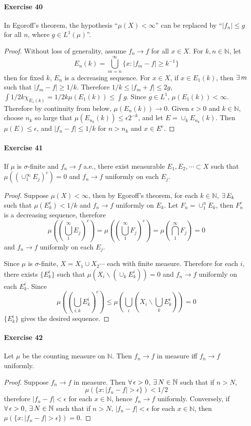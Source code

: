 \paragraph{Exercise 40}
In Egoroff's theorem, the hypothesis ``$\mu(X)<\infty$'' can be replaced by ``$|f_n|\le g$ for all $n$, where $g\in L^1(\mu)$''.
\begin{proof}
    Without loss of generality, assume $f_n\to f$ for all $x\in X$. For $k,n\in\mathbb{N}$, let 
    $$
    E_n(k)=\bigcup^\infty_{m=n}\{x:|f_m-f|\ge k^{-1}\}
    $$
    then for fixed $k$, $E_n$ is a decreasing sequence. For $x\in X$, if $x\in E_1(k)$, then $\exists\, m$ such that $|f_m-f|\ge 1/k$. Therefore $1/k\le|f_m+f|\le 2g$, $\int 1/2k\chi_{E_{1}(k)}=1/2k\mu(E_{1}(k))\le\int g$. Since $g\in L^1$, $\mu(E_{1}(k))<\infty$. Therefore by continuity from below, $\mu(E_n(k))\to 0$. Given $\epsilon>0$ and $k\in\mathbb{N}$, choose $n_k$ so large that $\mu(E_{n_k}(k))\le\epsilon 2^{-k}$, and let $E=\cup_kE_{n_k}(k)$. Then $\mu(E)\le\epsilon$, and $|f_n-f|\le 1/k$ for $n>n_k$ and $x\in E^c$.
\end{proof}
\paragraph{Exercise 41}
If $\mu$ is $\sigma$-finite and $f_n\to f$ a.e., there exist measurable $E_1,E_2,\cdots\subset X$ such that $\mu((\cup^\infty_1E_j)^c)=0$ and $f_n\to f$ uniformly on each $E_j$.
\begin{proof}
    Suppose $\mu(X)<\infty$, then by Egoroff's theorem, for each $k\in\mathbb{N}$, $\exists\, E_k$ such that $\mu(E_k^c)<1/k$ and $f_n\to f$ uniformly on $E_k$. Let $F_n=\cup_1^n E_k$, then $F_n^c$ is a decreasing sequence, therefore
    $$
    \mu\left(\left(\bigcup_1^\infty E_j\right)^c\right)=\mu\left(\left(\bigcup_1^\infty F_j\right)^c\right)=\mu\left(\bigcap_1^\infty F_j\right)=0
    $$
    and $f_n\to f$ uniformly on each $E_j$.
    \par Since $\mu$ is $\sigma$-finite, $X=X_1\cup X_2\cdots$ each with finite measure. Therefore for each $i$, there exists $\{E^i_k\}$ such that $\mu(X_i\backslash(\cup_kE^i_k))=0$ and $f_n\to f$ uniformly on each $E^i_k$. Since
    $$
    \mu\left(\left(\bigcup_{i,k}E^i_k\right)^c\right)\le\mu\left(\bigcup_i\left(X_i\backslash\bigcup_kE^i_k\right)\right)=0
    $$
    $\{E^i_k\}$ gives the desired sequence.
\end{proof}
\paragraph{Exercise 42}
Let $\mu$ be the counting measure on $\mathbb{N}$. Then $f_n\to f$ in measure iff $f_n\to f$ uniformly.
\begin{proof}
    Suppose $f_n\to f$ in measure. Then $\forall\,\epsilon>0$, $\exists\, N\in\mathbb{N}$ such that if $n>N$,
    $$
    \mu(\{x:|f_n-f|>\epsilon\})<1/2
    $$
    therefore $|f_n-f|<\epsilon$ for each $x\in\mathbb{N}$, hence $f_n\to f$ uniformly. Conversely, if $\forall\,\epsilon>0$, $\exists\, N\in\mathbb{N}$ such that if $n>N$, $|f_n-f|<\epsilon$ for each $x\in\mathbb{N}$, then $\mu(\{x:|f_n-f|>\epsilon\})=0$.
\end{proof}
